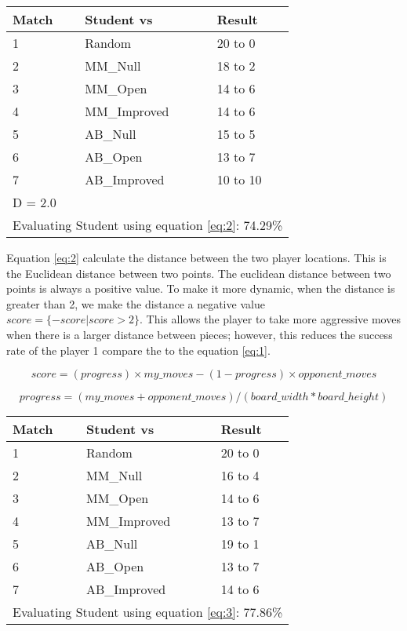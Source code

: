 \documentclass{article}
\begin{document}
\begin{center}
\begin{tabular}{|l|l|l|} \hline
	Match & Student vs & Result \\ \hline
	1 & Random & 20 to 0\\
	2 & MM\_Null & 18 to 2\\
	3 & MM\_Open & 14 to 6\\
	4 & MM\_Improved & 14 to 6\\
	5 & AB\_Null & 15 to 5\\
	6 & AB\_Open & 13 to 7\\
	7 & AB\_Improved & 10 to 10\\ \hline\hline
	\multicolumn{3}{|l|}{D = 2.0} \\ \hline
	\multicolumn{3}{|l|}{Evaluating Student using equation \ref{eq:2}: 74.29\% } \\ \hline
\end{tabular}
\end{center}

Equation \ref{eq:2} calculate the distance between the two player locations. This is the Euclidean distance between two points. The euclidean distance between two points is always a positive value. To make it more dynamic, when the distance is greater than 2, we make the distance a negative value $score = \{-score|score > 2\}$. This allows the player to take more aggressive moves when there is a larger distance between pieces; however, this reduces the success rate of the player 1 compare the to the equation \ref{eq:1}.


\begin{equation}
score = (progress) \times my\_moves - (1-progress) \times opponent\_moves
\label{eq:3}
\end{equation}

\begin{equation}
progress=(my\_moves+opponent\_moves)/(board\_width * board\_height)
\label{eq:4}
\end{equation}


\begin{center}
\begin{tabular}{|l|l|l|} \hline
	Match & Student vs & Result \\ \hline
	1 & Random & 20 to 0 \\
	2 & MM\_Null & 16 to 4 \\
	3 & MM\_Open & 14 to 6 \\
	4 & MM\_Improved & 13 to 7 \\
	5 & AB\_Null & 19 to 1 \\
	6 & AB\_Open & 13 to 7 \\
	7 & AB\_Improved & 14 to 6 \\ \hline\hline
	\multicolumn{3}{|l|}{Evaluating Student using equation \ref{eq:3}: 77.86\%} \\ \hline
\end{tabular}
\end{center}
\end{document}
